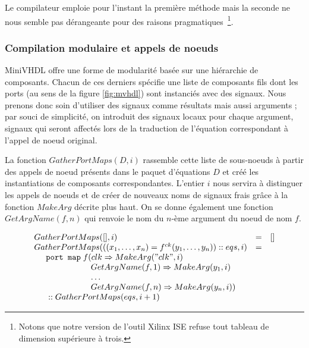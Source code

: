 \documentclass[a4paper]{article}
\newcommand{\mybox}[1]{\mbox{\tt{#1}}}
\newcommand{\ind}[0]{\hspace{0.5cm}}
\newcommand{\Cons}[0]{\; \mathbf{::} \;}
\newcommand{\App}[2]{#1^{ck}(#2)}
\begin{document}
Le compilateur emploie pour l'instant la premi\`ere m\'ethode mais la seconde ne
nous semble pas d\'erangeante pour des raisons pragmatiques~\footnote{Notons que
  notre version de l'outil Xilinx ISE refuse tout tableau de
  dimension sup\'erieure \`a trois.}.

\subsubsection{Compilation modulaire et appels de noeuds}

MiniVHDL offre une forme de modularit\'e bas\'ee sur une hi\'erarchie de
composants. Chacun de ces derniers sp\'ecifie une liste de composants fils dont
les ports (au sens de la figure \ref{fig:mvhdl}) sont instanci\'es avec des
signaux. Nous prenons donc soin d'utiliser des signaux comme r\'esultats mais
aussi arguments ; par souci de simplicit\'e, on introduit des signaux locaux pour
chaque argument, signaux qui seront affect\'es lors de la traduction de l'\'equation
correspondant \`a l'appel de noeud original.

La fonction $GatherPortMaps(D, i)$ rassemble cette liste de sous-noeuds \`a partir
des appels de noeud pr\'esents dans le paquet d'\'equations $D$ et cr\'e\'e les
instantiations de composants correspondantes. L'entier $i$ nous servira \`a
distinguer les appels de noeuds et de cr\'eer de nouveaux noms de signaux frais
gr\^ace \`a la fonction $MakeArg$ d\'ecrite plus haut. On se donne \'egalement une
fonction $GetArgName(f,n)$ qui renvoie le nom du $n$-\`eme argument du noeud de
nom $f$.

\newcommand{\GPM}[2]{GatherPortMaps(#1,#2)}
\newcommand{\GAN}[2]{GetArgName(#1,#2)}

\[
\begin{array}{lcl}
  \GPM{[]}{i} & = & [] \\
  \GPM{((x_1,\dots,x_n) = \App{f}{y_1,\dots,y_n}) \Cons eqs}{i} & = &
  \\
  \ind \mybox{port map} \; f ( clk \Rightarrow \MA{"clk"}{i} \\
  \ind \ind \ind \ind \hspace{0.4cm} \GAN{f}{1} \Rightarrow \MA{y_1}{i} \\
  \ind \ind \ind \ind \hspace{0.4cm} \dots \\
  \ind \ind \ind \ind \hspace{0.4cm} \GAN{f}{n} \Rightarrow \MA{y_n}{i}) \\
  \ind \Cons \GPM{eqs}{i + 1}
\end{array}
\]
\end{document}

